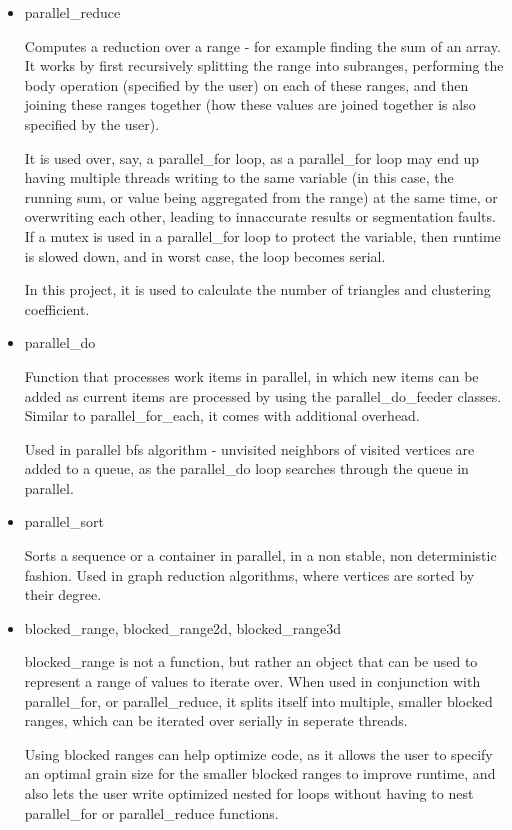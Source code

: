 \documentclass[12pt]{article}
\begin{document}
\begin{itemize}
  \item parallel\_reduce

  Computes a reduction over a range - for example finding the sum of an array. It works by first recursively splitting the range into subranges, performing the body operation (specified by the user) on each of these ranges, and then joining these ranges together (how these values are joined together is also specified by the user).

  It is used over, say, a parallel\_for loop, as a parallel\_for loop may end up having multiple threads writing to the same variable (in this case, the running sum, or value being aggregated from the range) at the same time, or overwriting each other, leading to innaccurate results or segmentation faults. If a mutex is used in a parallel\_for loop to protect the variable, then runtime is slowed down, and in worst case, the loop becomes serial.

  In this project, it is used to calculate the number of triangles and clustering coefficient.

  \item parallel\_do

  Function that processes work items in parallel, in which new items can be added as current items are processed by using the parallel\_do\_feeder classes. Similar to parallel\_for\_each, it comes with additional overhead. 

  Used in parallel bfs algorithm - unvisited neighbors of visited vertices are added to a queue, as the parallel\_do loop searches through the queue in parallel.

  \item parallel\_sort

  Sorts a sequence or a container in parallel, in a non stable, non deterministic fashion. Used in graph reduction algorithms, where vertices are sorted by their degree.

  \item blocked\_range, blocked\_range2d, blocked\_range3d

  blocked\_range is not a function, but rather an object that can be used to represent a range of values to iterate over. When used in conjunction with parallel\_for, or parallel\_reduce, it splits itself into multiple, smaller blocked ranges, which can be iterated over serially in seperate threads.

  Using blocked ranges can help optimize code, as it allows the user to specify an optimal grain size for the smaller blocked ranges to improve runtime, and also lets the user write optimized nested for loops without having to nest parallel\_for or parallel\_reduce functions.

\end{itemize}
\end{document}
